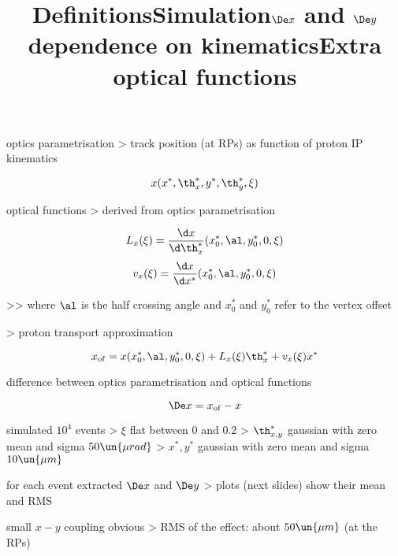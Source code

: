 


\newpage %

\def\author{J.~Kašpar}
\def\caption{}
\def\date{3 Dec 2018}



\newpage %
\title{Definitions}

\> optics parametrisation
\>> track position (at RPs) as function of proton IP kinematics

\cThird
$$x(x^*, \th^*_x, y^*, \th^*_y, \xi)$$

\> optical functions
\>> derived from optics parametrisation


\cThird
$$L_x(\xi) = {\d x\over\d\th^*_x}(x^*_0, \al, y^*_0, 0, \xi)$$
$$v_x(\xi) = {\d x\over\d x^*}(x^*_0, \al, y^*_0, 0, \xi)$$

\>>> where $\al$ is the half crossing angle and $x^*_0$ and $y^*_0$ refer to the vertex offset

\>> proton transport approximation

\cThird
$$x_{\rm of} = x(x^*_0, \al, y^*_0, 0, \xi) + L_x(\xi) \th^*_x + v_x(\xi) x^*$$


\> difference between optics parametrisation and optical functions

\cThird
$$\De x = x_{\rm of} - x$$

\newpage %
\title{Simulation}

\> simulated $10^4$ events
\>> $\xi$ flat between $0$ and $0.2$
\>> $\th^*_{x, y}$ gaussian with zero mean and sigma $50\un{\mu rad}$
\>> $x^*, y^*$ gaussian with zero mean and sigma $10\un{\mu m}$

\> for each event extracted $\De x$ and $\De y$
\>> plots (next slides) show their mean and RMS


\newpage %
\title{$\De x$ and $\De y$ dependence on kinematics}

\centerline{}

\> small $x-y$ coupling obvious
\>> RMS of the effect: about $50\un{\mu m}$ (at the RPs)


\newpage %
\title{Extra optical functions}

